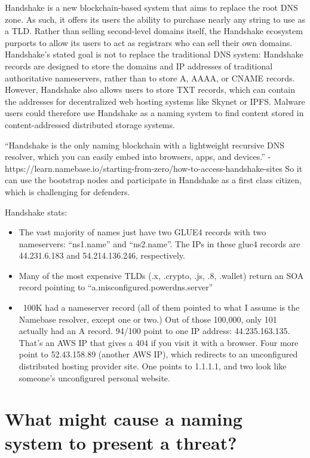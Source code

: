 \documentclass[10pt,sigconf,letterpaper]{acmart}
\begin{document}
Handshake is a new blockchain-based system that aims to 
replace the root DNS 
zone. As such, it offers its users the ability to purchase 
nearly any string to 
use as a TLD. Rather than selling second-level domains 
itself, the Handshake ecosystem purports to allow its users 
to act as registrars who can sell their own domains. 
Handshake's stated goal is not to replace the traditional DNS 
system: Handshake records are designed to store the domains 
and IP addresses of traditional authoritative nameservers, 
rather than to store A, AAAA, or CNAME records. However, 
Handshake also allows users to store TXT records, which can 
contain the addresses for decentralized web hosting systems 
like Skynet or IPFS. Malware users could therefore use 
Handshake as a naming system to find content stored in 
content-addressed distributed storage systems.

``Handshake is the only naming blockchain with a lightweight 
recursive DNS resolver, which you can easily embed into 
browsers, apps, and devices.'' - 
https://learn.namebase.io/starting-from-zero/how-to-access-handshake-sites
So it can use the bootstrap nodes and participate in 
Handshake as a first class citizen, which is challenging for 
defenders.

Handshake stats:
\begin{itemize}
	\item The vast majority of names just have two GLUE4 
	records with two nameservers: “ns1.name” and “ns2.name”. 
	The IPs in these glue4 records are 44.231.6.183 and 
	54.214.136.246, respectively.
	\item Many of the most expensive TLDs (.x, .crypto, .js, 
	.8, .wallet) return an SOA record pointing to 
	``a.misconfigured.powerdns.server''
	\item ~100K had a nameserver record (all of them pointed 
	to what I assume is the Namebase resolver, except one or 
	two.) Out of those 100,000, only 101 actually had an A 
	record. 94/100 point to one IP address: 44.235.163.135. 
	That's an AWS IP that gives a 404 if you visit it with a 
	browser. Four more point to 52.43.158.89 (another AWS 
	IP), which redirects to an unconfigured distributed 
	hosting provider site. One points to 1.1.1.1, and two 
	look like someone's unconfigured personal website.
\end{itemize}

\section{What might cause a naming system to present a threat?}
\end{document}
